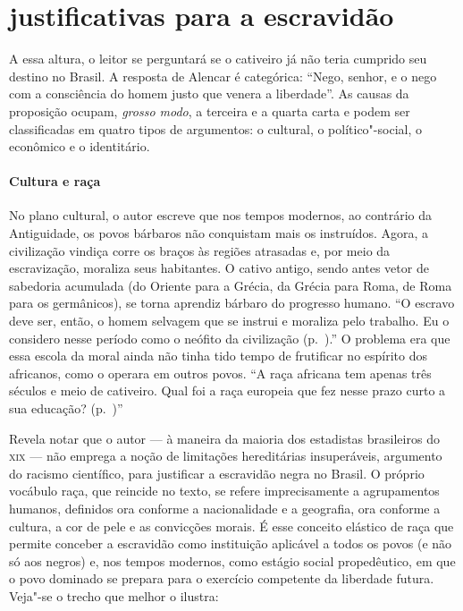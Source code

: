 \section{justificativas para a escravidão}

A essa altura, o leitor se perguntará se o cativeiro já não teria
cumprido seu destino no Brasil. A resposta de Alencar é categórica:
``Nego, senhor, e o nego com a consciência do homem justo que venera a
liberdade''. As causas da proposição ocupam, \textit{grosso modo}, a
terceira e a quarta carta e podem ser classificadas em quatro tipos de
argumentos: o cultural, o político"-social, o econômico e o
identitário. 

\paragraph{Cultura e raça}
No plano cultural, o autor escreve que nos tempos
modernos, ao contrário da Antiguidade, os povos bárbaros não conquistam
mais os instruídos. Agora, a civilização vindiça corre os braços às
regiões atrasadas e, por meio da escravização, moraliza seus
habitantes. O cativo antigo, sendo antes vetor de sabedoria acumulada
(do Oriente para a Grécia, da Grécia para Roma, de Roma para os
germânicos), se torna aprendiz bárbaro do progresso humano. ``O escravo
deve ser, então, o homem selvagem que se instrui e moraliza pelo
trabalho. Eu o considero nesse período como o neófito da civilização (p.~\pageref{cultura}).''
O problema era que essa escola da moral ainda não tinha tido tempo de
frutificar no espírito dos africanos, como o operara em outros povos.
``A raça africana tem apenas três séculos e meio de cativeiro. Qual foi
a raça europeia que fez nesse prazo curto a sua educação? (p.~\pageref{tresseculos})''

Revela notar que o autor --- à  maneira da maioria dos estadistas
brasileiros do \textsc{xix} --- não emprega a noção de limitações hereditárias
insuperáveis, argumento do racismo científico, para justificar a
escravidão negra no Brasil. O próprio vocábulo raça, que reincide no
texto, se refere imprecisamente a agrupamentos humanos, definidos ora
conforme a nacionalidade e a geografia, ora conforme a cultura, a cor
de pele e as convicções morais. É esse conceito elástico de raça que
permite conceber a escravidão como instituição aplicável a todos os
povos (e não só aos negros) e, nos tempos modernos, como estágio social
propedêutico, em que o povo dominado se prepara para o exercício
competente da liberdade futura. Veja"-se o trecho que melhor o ilustra: 

